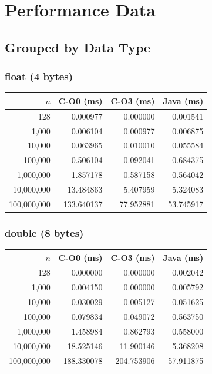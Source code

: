 \documentclass[12pt,a4paper]{article}
\begin{document}
\section{Performance Data}

\subsection{Grouped by Data Type}

\subsubsection*{float (4 bytes)}

\begin{table}[H]
\centering
\begin{tabular}{r r r r}
\toprule
$n$ & C-O0 (ms) & C-O3 (ms) & Java (ms) \\
\midrule
128         & 0.000977 & 0.000000 & 0.001541 \\
1{,}000     & 0.006104 & 0.000977 & 0.006875 \\
10{,}000    & 0.063965 & 0.010010 & 0.055584 \\
100{,}000   & 0.506104 & 0.092041 & 0.684375 \\
1{,}000{,}000   & 1.857178 & 0.587158 & 0.564042 \\
10{,}000{,}000  & 13.484863 & 5.407959 & 5.324083 \\
100{,}000{,}000 & 133.640137 & 77.952881 & 53.745917 \\
\bottomrule
\end{tabular}
\end{table}

\subsubsection*{double (8 bytes)}

\begin{table}[H]
\centering
\begin{tabular}{r r r r}
\toprule
$n$ & C-O0 (ms) & C-O3 (ms) & Java (ms) \\
\midrule
128         & 0.000000 & 0.000000 & 0.002042 \\
1{,}000     & 0.004150 & 0.000000 & 0.005792 \\
10{,}000    & 0.030029 & 0.005127 & 0.051625 \\
100{,}000   & 0.079834 & 0.049072 & 0.563750 \\
1{,}000{,}000   & 1.458984 & 0.862793 & 0.558000 \\
10{,}000{,}000  & 18.525146 & 11.900146 & 5.368208 \\
100{,}000{,}000 & 188.330078 & 204.753906 & 57.911875 \\
\bottomrule
\end{tabular}
\end{table}
\end{document}
